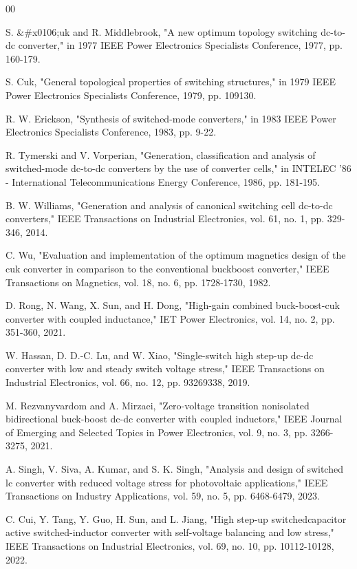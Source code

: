 \documentclass[10pt,conference]{IEEEtran}
\begin{document}
\begin{thebibliography}{00}

S. &#x0106;uk and R. Middlebrook, "A new optimum topology switching dc-to-dc converter," in 1977 IEEE Power Electronics Specialists Conference, 1977, pp. 160-179.

S. Cuk, "General topological properties of switching structures," in 1979 IEEE Power Electronics Specialists Conference, 1979, pp. 109130.

R. W. Erickson, "Synthesis of switched-mode converters," in 1983 IEEE Power Electronics Specialists Conference, 1983, pp. 9-22.

R. Tymerski and V. Vorperian, "Generation, classification and analysis of switched-mode dc-to-dc converters by the use of converter cells," in INTELEC '86 - International Telecommunications Energy Conference, 1986, pp. 181-195.

B. W. Williams, "Generation and analysis of canonical switching cell dc-to-dc converters," IEEE Transactions on Industrial Electronics, vol. 61, no. 1, pp. 329-346, 2014.

C. Wu, "Evaluation and implementation of the optimum magnetics design of the cuk converter in comparison to the conventional buckboost converter," IEEE Transactions on Magnetics, vol. 18, no. 6, pp. 1728-1730, 1982.

D. Rong, N. Wang, X. Sun, and H. Dong, "High-gain combined buck-boost-cuk converter with coupled inductance," IET Power Electronics, vol. 14, no. 2, pp. 351-360, 2021.

W. Hassan, D. D.-C. Lu, and W. Xiao, "Single-switch high step-up dc-dc converter with low and steady switch voltage stress," IEEE Transactions on Industrial Electronics, vol. 66, no. 12, pp. 93269338, 2019.

M. Rezvanyvardom and A. Mirzaei, "Zero-voltage transition nonisolated bidirectional buck-boost dc-dc converter with coupled inductors," IEEE Journal of Emerging and Selected Topics in Power Electronics, vol. 9, no. 3, pp. 3266-3275, 2021.

A. Singh, V. Siva, A. Kumar, and S. K. Singh, "Analysis and design of switched lc converter with reduced voltage stress for photovoltaic applications," IEEE Transactions on Industry Applications, vol. 59, no. 5, pp. 6468-6479, 2023.

C. Cui, Y. Tang, Y. Guo, H. Sun, and L. Jiang, "High step-up switchedcapacitor active switched-inductor converter with self-voltage balancing and low stress," IEEE Transactions on Industrial Electronics, vol. 69, no. 10, pp. 10112-10128, 2022.


\end{thebibliography}
\end{document}
